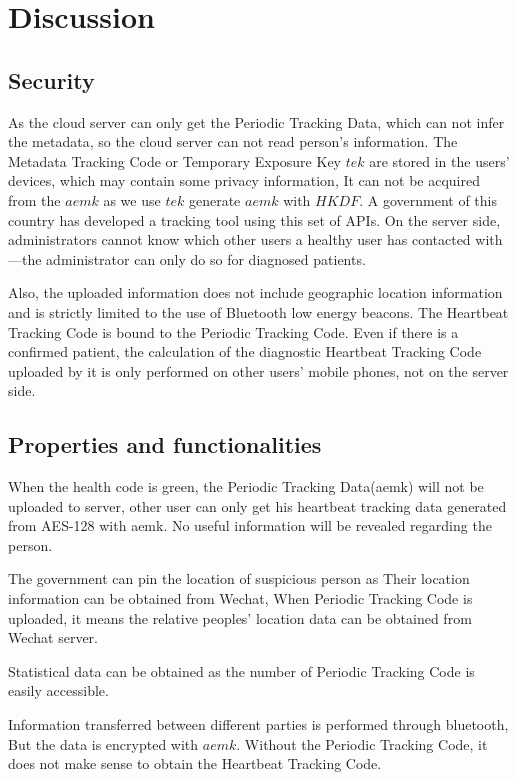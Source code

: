 \documentclass[11pt,en]{elegantpaper}
\begin{document}
\section{Discussion}
\subsection{Security}
As the cloud server can only get the Periodic Tracking Data, which can not infer the metadata, so the cloud server can not read person's information. The Metadata Tracking Code or Temporary Exposure Key $tek$ are stored in the users' devices, which may contain some privacy information, It can not be acquired from the $aemk$ as we use $tek$ generate $aemk$ with $HKDF$. A government of this country has developed a tracking tool using this set of APIs. On the server side, administrators cannot know which other users a healthy user has contacted with—the administrator can only do so for diagnosed patients.

Also, the uploaded information does not include geographic location information and is strictly limited to the use of Bluetooth low energy beacons. The Heartbeat Tracking Code is bound to the Periodic Tracking Code. Even if there is a confirmed patient, the calculation of the diagnostic Heartbeat Tracking Code uploaded by it is only performed on other users' mobile phones, not on the server side.



\subsection{Properties and functionalities}

When the health code is green, the Periodic Tracking Data(aemk) will not be uploaded to server, other user can only get his heartbeat tracking data generated from AES-128 with aemk. No useful information will be revealed regarding the person.

The government can pin the location of suspicious person as Their location information can be obtained from Wechat, When Periodic Tracking Code is uploaded, it means the relative peoples' location data can be obtained from Wechat server.

Statistical data can be obtained as the number of Periodic Tracking Code is easily accessible. 

Information transferred between different parties is performed through bluetooth, But the data is encrypted with $aemk$. Without the Periodic Tracking Code, it does not make sense to obtain the Heartbeat Tracking Code.
\end{document}
